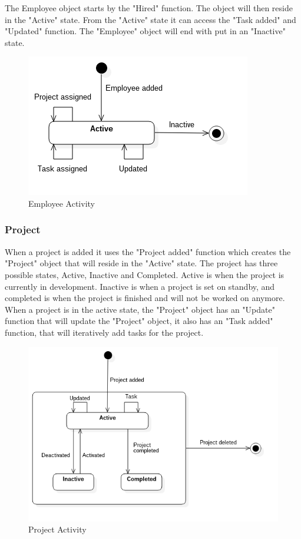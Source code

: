 The Employee object starts by the "Hired" function. The object will then reside in the "Active" state. From the "Active" state it can access the "Task added" and "Updated" function. The "Employee" object will end with put in an "Inactive" state. %

\begin{figure}[H]
    \centering
    \includegraphics[scale=0.6]{Images/ProblemDomain/employeeActivityDiagram.png}
    \caption{Employee Activity}
    \label{fig:employeeActivityDiagram}
\end{figure}

\subsubsection*{Project}

When a project is added it uses the "Project added" function which creates the "Project" object that will reside in the "Active" state. The project has three possible states, Active, Inactive and Completed. Active is when the project is currently in development. Inactive is when a project is set on standby, and completed is when the project is finished and will not be worked on anymore. When a project is in the active state, the "Project" object has an "Update" function that will update the "Project" object, it also has an "Task added" function, that will iteratively add tasks for the project. 

\begin{figure}[H]
    \centering
    \includegraphics[scale=0.4]{Images/ProblemDomain/projectActivityDiagram.png}
    \caption{Project Activity}
    \label{fig:projectActivityDiagram}
\end{figure}

